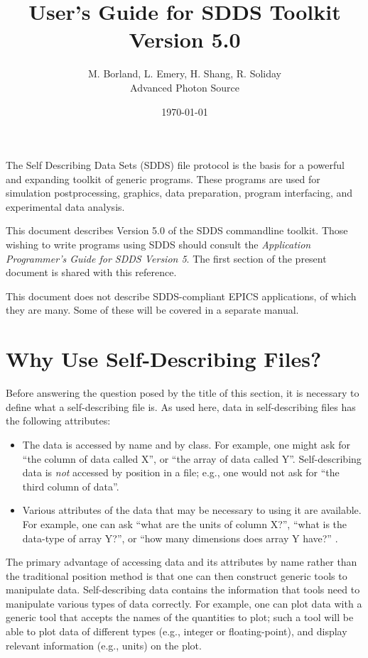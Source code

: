 \documentclass[11pt]{article}
\begin{document}
\title{User's Guide for SDDS Toolkit Version 5.0}
\author{M. Borland, L. Emery, H. Shang, R. Soliday\\Advanced Photon Source}
\date{\today}
\maketitle

The Self Describing Data Sets (SDDS) file protocol is the basis for a
powerful and expanding toolkit of generic programs. These
programs are used for simulation postprocessing, graphics, data
preparation, program interfacing, and experimental data analysis.

This document describes Version 5.0 of the SDDS commandline toolkit.
Those wishing to write programs using SDDS should consult the {\em
Application Programmer's Guide for SDDS Version 5}\cite{SDDS_AP5}.
The first section of the present document is shared with this
reference.

This document does not describe SDDS-compliant EPICS applications, of
which they are many. Some of these will be covered in a separate
manual.

\section{Why Use Self-Describing Files?}

Before answering the question posed by the title of this section, it
is necessary to define what a self-describing file is.  As used here,
data in self-describing files has the following attributes:
\begin{itemize}
\item The data is accessed by name and by class.  For example, one
 might ask for ``the column of data called X'', or ``the array of data
 called Y''.  Self-describing data is {\em not} accessed by position
 in a file; e.g., one would not ask for ``the third column of data''.
\item Various attributes of the data that may be necessary to using it
 are available.  For example, one can ask ``what are the units of
 column X?'', ``what is the data-type of array Y?'', or ``how many
 dimensions does array Y have?'' .
\end{itemize}

The primary advantage of accessing data and its attributes by name
rather than the traditional position method is that one can then
construct generic tools to manipulate data. Self-describing data
contains the information that tools need to manipulate various types
of data correctly.  For example, one can plot data with a generic tool
that accepts the names of the quantities to plot; such a tool will be
able to plot data of different types (e.g., integer or
floating-point), and display relevant information (e.g., units) on the
plot.
\end{document}
